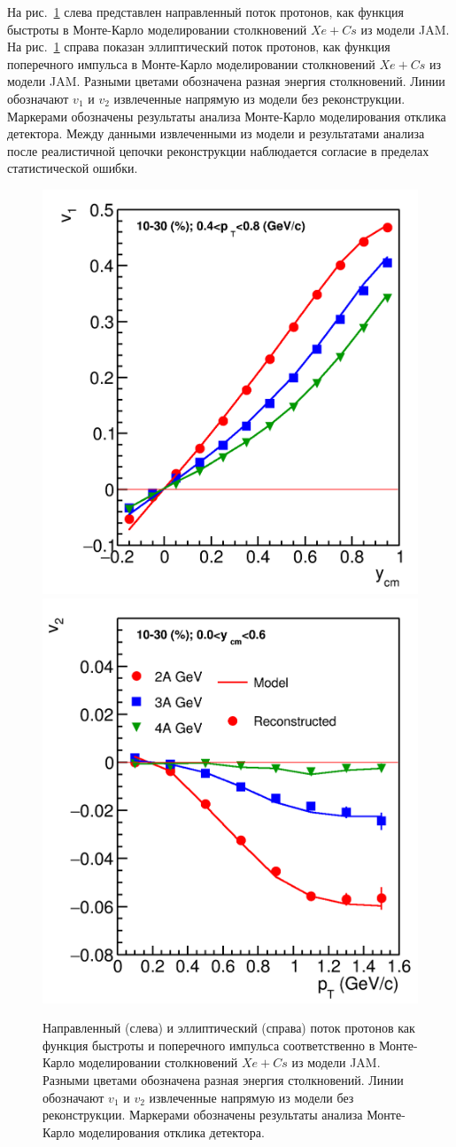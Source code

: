 На рис.~\ref{fig:bmn_v1_v2} слева представлен направленный поток протонов, как функция быстроты в Монте-Карло моделировании столкновений $Xe+Cs$ из модели JAM. 
На рис.~\ref{fig:bmn_v1_v2} справа показан эллиптический поток протонов, как функция поперечного импульса в Монте-Карло моделировании столкновений $Xe+Cs$ из модели JAM. 
Разными цветами обозначена разная энергия столкновений. 
Линии обозначают $v_1$ и $v_2$ извлеченные напрямую из модели без реконструкции. 
Маркерами обозначены результаты анализа Монте-Карло моделирования отклика детектора.
Между данными извлеченными из модели и результатами анализа после реалистичной цепочки реконструкции наблюдается согласие в пределах статистической ошибки. 
%
\begin{figure}[ht]
\begin{center}
\includegraphics[width=0.45\linewidth]{images/v1_proton_tof_rapidity.png}
\includegraphics[width=0.45\linewidth]{images/v2_proton_tof_pT.png}
\caption{ 
    Направленный (слева) и эллиптический (справа) поток протонов как функция быстроты и поперечного импульса соответственно в Монте-Карло моделировании столкновений $Xe+Cs$ из модели JAM. Разными цветами обозначена разная энергия столкновений. Линии обозначают $v_1$ и $v_2$ извлеченные напрямую из модели без реконструкции. Маркерами обозначены результаты анализа Монте-Карло моделирования отклика детектора.
}
\label{fig:bmn_v1_v2}
\end{center}
\end{figure}

